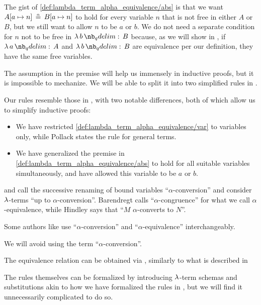 \begin{comments}
  \item The gist of \ref{def:lambda_term_alpha_equivalence/abs} is that we want \( A[a \mapsto n] \aequiv B[a \mapsto n] \) to hold for every variable \( n \) that is not free in either \( A \) or \( B \), but we still want to allow \( n \) to be \( a \) or \( b \). We do not need a separate condition for \( n \) not to be free in \( \qabs b B \) because, as we will show in , if \( \qabs a A \) and \( \qabs b B \) are equivalence per our definition, they have the same free variables.

  The assumption in the premise will help us immensely in inductive proofs, but it is impossible to mechanize. We will be able to split it into two simplified rules in .

  \item Our rules resemble those in \cite[5]{Pollack1994}, with two notable differences, both of which allow us to simplify inductive proofs:
  \begin{itemize}
    \item We have restricted \ref{def:lambda_term_alpha_equivalence/var} to variables only, while Pollack states the rule for general terms.
    \item We have generalized the premise in \ref{def:lambda_term_alpha_equivalence/abs} to hold for all suitable variables simultaneously, and have allowed this variable to be \( a \) or \( b \).
  \end{itemize}

  \item {} and  call the successive renaming of bound variables \enquote{\( \alpha \)-conversion} and consider \( \mathrm{\lambda} \)-terms \enquote{up to \( \alpha \)-conversion}. Barendregt calls \enquote{\( \alpha \)-congruence} for what we call \( \alpha \)-equivalence, while Hindley says that \enquote{\( M \) \( \alpha \)-converts to \( N \)}.

  Some authors like  use \enquote{\( \alpha \)-conversion} and \enquote{\( \alpha \)-equivalence} interchangeably.

  We will avoid using the term \enquote{\( \alpha \)-conversion}.

  \item The equivalence relation can be obtained via , similarly to what is described in 

  \item The rules themselves can be formalized by introducing \( \mathrm{\lambda} \)-term schemas and substitutions akin to how we have formalized the rules in , but we will find it unnecessarily complicated to do so.
\end{comments}

